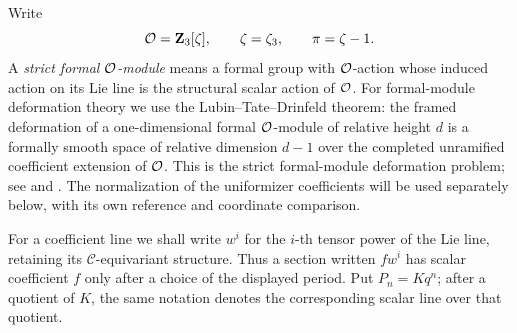 Write
\[
 \mathcal O=\mathbf Z_3[\zeta],\qquad \zeta=\zeta_3,\qquad \pi=\zeta-1.
\]
A \emph{strict formal \(\mathcal O\)-module} means a formal group with
\(\mathcal O\)-action whose induced action on its Lie line is the
structural scalar action of \(\mathcal O\).  For formal-module deformation
theory we use the Lubin--Tate--Drinfeld theorem: the framed deformation
of a one-dimensional formal \(\mathcal O\)-module of relative height \(d\)
is a formally smooth space of relative dimension \(d-1\) over the
completed unramified coefficient extension of \(\mathcal O\).
This is the strict formal-module deformation problem; see
\cite{LubinTate,Drinfeld} and \cite[Theorem~8.4]{RapoportZink}.
The normalization of the uniformizer coefficients will be used
separately below, with its own reference and coordinate comparison.

For a coefficient line we shall write \(w^i\) for the \(i\)-th tensor
power of the Lie line, retaining its \(\mathcal C\)-equivariant
structure.  Thus a section written \(f w^i\) has scalar coefficient
\(f\) only after a choice of the displayed period.
Put \(P_n=Kq^n\); after a quotient of \(K\), the same notation denotes
the corresponding scalar line over that quotient.

